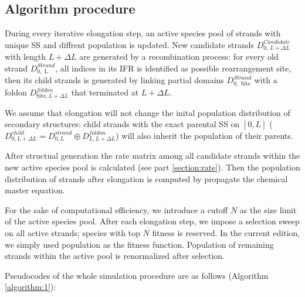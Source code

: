 \documentclass[11pt, a4paper]{article}
\begin{document}
\subsection{Algorithm procedure}

During every iterative elongation step, an active species pool of strands with unique SS and diffrent population is updated. New candidate strands $D^{Candidate}_{0,\, L+\Delta L}$ with
length $L+\Delta L$ are generated by a recombination
process: for every old strand $D^{Strand}_{0, \text{ L}}$, all indices in its IFR is identified as possible rearrangement site, then its child strands is generated by linking partial domains
$D^{Strand}_{0, \text{ Site}}$ with a foldon $D^{foldon}_{\text{Site}, L+\Delta L}$ that terminated at $L+\Delta L$.

We assume that elongation will not change the inital population distribution
of secondary structures: child strands with the exact parental SS on $[0, L]$ ($D^{child}_{0, L+\Delta L} = D^{strand}_{0, L} \oplus D^{foldon}_{L, L+\Delta L}$) will also inherit the population of their parents.

After structual generation the rate matrix among all candidate strands within the new active species pool is calculated (see part \ref{section:rate}). Then the population
distribution of strands after elongation is computed by propagate the chemical master equation.

For the sake of computational efficiency, we introduce a cutoff $N $ as the size limit of the active species pool. After each elongation step, we impose a selection sweep on all active
strands; species with top $N $ fitness is reserved. In the current edition, we simply used population as the fitness function. Population of remaining strands within
the active pool is renormalized after selection.

Pseudocodes of the whole simulation procedure are as follows (Algorithm \ref{algorithm:1}):
\end{document}
